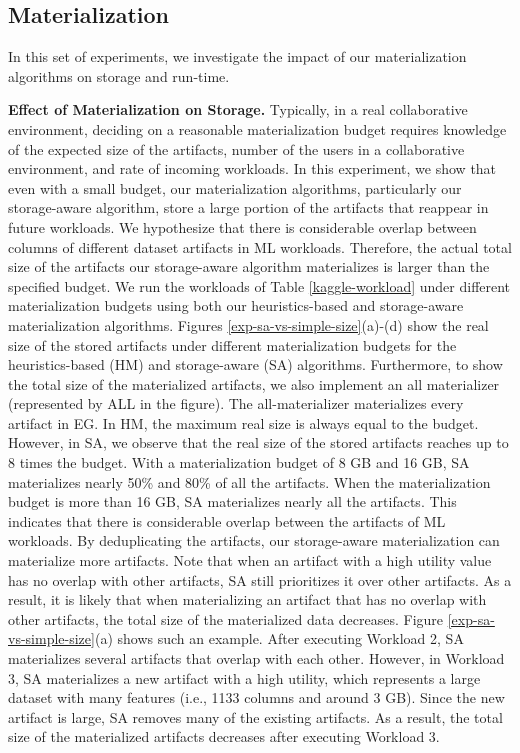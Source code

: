 \subsection{Materialization}
In this set of experiments, we investigate the impact of our materialization algorithms on storage and run-time.

\textbf{Effect of Materialization on Storage.}
Typically, in a real collaborative environment, deciding on a reasonable materialization budget requires knowledge of the expected size of the artifacts, number of the users in a collaborative environment, and rate of incoming workloads.
In this experiment, we show that even with a small budget, our materialization algorithms, particularly our storage-aware algorithm, store a large portion of the artifacts that reappear in future workloads.
We hypothesize that there is considerable overlap between columns of different dataset artifacts in ML workloads.
Therefore, the actual total size of the artifacts our storage-aware algorithm materializes is larger than the specified budget.
We run the workloads of Table \ref{kaggle-workload} under different materialization budgets using both our heuristics-based and storage-aware materialization algorithms.
Figures \ref{exp-sa-vs-simple-size}(a)-(d) show the real size of the stored artifacts under different materialization budgets for the heuristics-based (HM) and storage-aware (SA) algorithms.
Furthermore, to show the total size of the materialized artifacts, we also implement an all materializer (represented by ALL in the figure).
The all-materializer materializes every artifact in EG.
In HM, the maximum real size is always equal to the budget.
However, in SA, we observe that the real size of the stored artifacts reaches up to 8 times the budget.
With a materialization budget of 8 GB and 16 GB, SA materializes nearly 50\% and 80\% of all the artifacts.
When the materialization budget is more than 16 GB, SA materializes nearly all the artifacts.
This indicates that there is considerable overlap between the artifacts of ML workloads.
By deduplicating the artifacts, our storage-aware materialization can materialize more artifacts.
Note that when an artifact with a high utility value has no overlap with other artifacts, SA still prioritizes it over other artifacts.
As a result, it is likely that when materializing an artifact that has no overlap with other artifacts, the total size of the materialized data decreases.
Figure \ref{exp-sa-vs-simple-size}(a) shows such an example.
After executing Workload 2, SA materializes several artifacts that overlap with each other.
However, in Workload 3, SA materializes a new artifact with a high utility, which represents a large dataset with many features (i.e., 1133 columns and around 3 GB).
Since the new artifact is large, SA removes many of the existing artifacts.
As a result, the total size of the materialized artifacts decreases after executing Workload 3.

